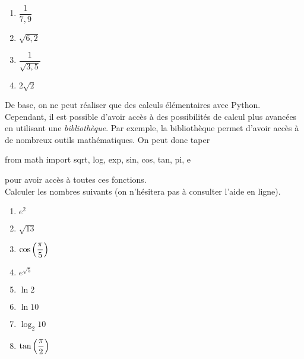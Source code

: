\begin{multicols}{2}
  \begin{enumerate}[label=\emph{\alph*)}]
    \item $\dfrac{1}{7,9}$
    \item $\sqrt{6,2}$
    \item $\dfrac{1}{\sqrt{3,5}}$
    \item $2\sqrt{2}$
  \end{enumerate}
\end{multicols}
De base, on ne peut réaliser que des calculs élémentaires avec Python. Cependant, il est possible d'avoir accès à des possibilités de calcul plus avancées en utilisant une \emph{bibliothèque}. 
Par exemple, la bibliothèque  permet d'avoir accès à de nombreux outils mathématiques. 
On peut donc taper
\begin{pyverbatim}
  from math import sqrt, log, exp, sin, cos, tan, pi, e 
\end{pyverbatim}
pour avoir accès à toutes ces fonctions. \\
Calculer les nombres suivants (on n'hésitera pas à consulter l'aide en ligne).
\begin{multicols}{2}
  \begin{enumerate}[label=\emph{\alph*)}]
    \item $e^2$
    \item $\sqrt{13}$
    \item $\cos\left( \dfrac{\pi}{5}\right)$
    \item $e^{\sqrt{5}}$
    \item $\ln 2$
    \item $\ln 10$
    \item $\log_{2} 10$
    \item $\tan\left( \dfrac{\pi}{2}\right)$
  \end{enumerate}
\end{multicols}


